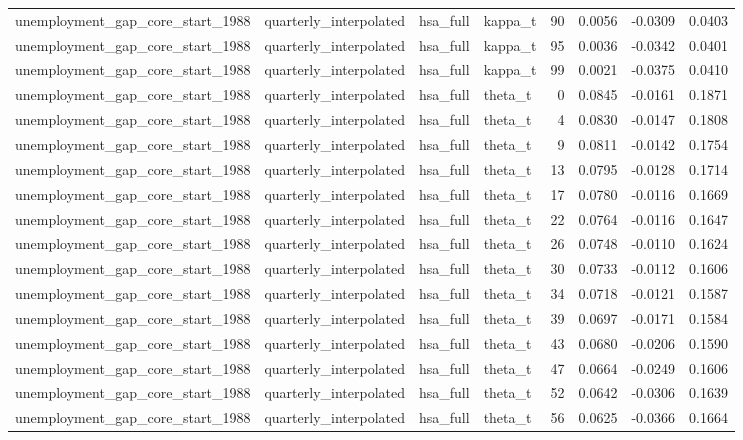 \begin{tabular}{llllrrrr}
unemployment\_gap\_core\_start\_1988 & quarterly\_interpolated & hsa\_full & kappa\_t & 90 & 0.0056 & -0.0309 & 0.0403 \\
unemployment\_gap\_core\_start\_1988 & quarterly\_interpolated & hsa\_full & kappa\_t & 95 & 0.0036 & -0.0342 & 0.0401 \\
unemployment\_gap\_core\_start\_1988 & quarterly\_interpolated & hsa\_full & kappa\_t & 99 & 0.0021 & -0.0375 & 0.0410 \\
unemployment\_gap\_core\_start\_1988 & quarterly\_interpolated & hsa\_full & theta\_t & 0 & 0.0845 & -0.0161 & 0.1871 \\
unemployment\_gap\_core\_start\_1988 & quarterly\_interpolated & hsa\_full & theta\_t & 4 & 0.0830 & -0.0147 & 0.1808 \\
unemployment\_gap\_core\_start\_1988 & quarterly\_interpolated & hsa\_full & theta\_t & 9 & 0.0811 & -0.0142 & 0.1754 \\
unemployment\_gap\_core\_start\_1988 & quarterly\_interpolated & hsa\_full & theta\_t & 13 & 0.0795 & -0.0128 & 0.1714 \\
unemployment\_gap\_core\_start\_1988 & quarterly\_interpolated & hsa\_full & theta\_t & 17 & 0.0780 & -0.0116 & 0.1669 \\
unemployment\_gap\_core\_start\_1988 & quarterly\_interpolated & hsa\_full & theta\_t & 22 & 0.0764 & -0.0116 & 0.1647 \\
unemployment\_gap\_core\_start\_1988 & quarterly\_interpolated & hsa\_full & theta\_t & 26 & 0.0748 & -0.0110 & 0.1624 \\
unemployment\_gap\_core\_start\_1988 & quarterly\_interpolated & hsa\_full & theta\_t & 30 & 0.0733 & -0.0112 & 0.1606 \\
unemployment\_gap\_core\_start\_1988 & quarterly\_interpolated & hsa\_full & theta\_t & 34 & 0.0718 & -0.0121 & 0.1587 \\
unemployment\_gap\_core\_start\_1988 & quarterly\_interpolated & hsa\_full & theta\_t & 39 & 0.0697 & -0.0171 & 0.1584 \\
unemployment\_gap\_core\_start\_1988 & quarterly\_interpolated & hsa\_full & theta\_t & 43 & 0.0680 & -0.0206 & 0.1590 \\
unemployment\_gap\_core\_start\_1988 & quarterly\_interpolated & hsa\_full & theta\_t & 47 & 0.0664 & -0.0249 & 0.1606 \\
unemployment\_gap\_core\_start\_1988 & quarterly\_interpolated & hsa\_full & theta\_t & 52 & 0.0642 & -0.0306 & 0.1639 \\
unemployment\_gap\_core\_start\_1988 & quarterly\_interpolated & hsa\_full & theta\_t & 56 & 0.0625 & -0.0366 & 0.1664 \\

\end{tabular}
